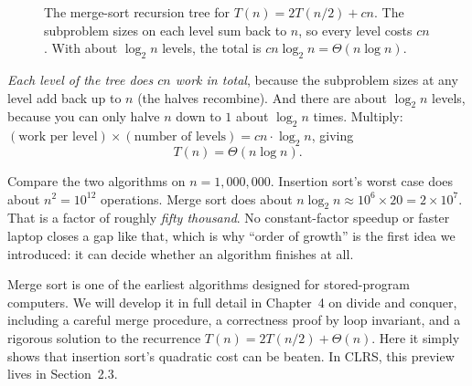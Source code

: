 \begin{figure}[H]
\centering
{}
\caption{The merge-sort recursion tree for $T(n)=2T(n/2)+cn$. The subproblem sizes on
each level sum back to $n$, so every level costs $cn$. With about $\log_2 n$ levels, the
total is $cn\log_2 n = \Theta(n\log n)$.}
\label{ch02:fig-tree}
\end{figure}

\emph{Each level of the tree does $cn$ work in total}, because the
subproblem sizes at any level add back up to $n$ (the halves recombine). And there are
about $\log_2 n$ levels, because you can only halve $n$ down to $1$ about $\log_2 n$
times. Multiply: $(\text{work per level}) \times (\text{number of levels}) = cn \cdot
\log_2 n$, giving
\[
T(n) = \Theta(n \log n).
\]

\begin{focusbox}
Compare the two algorithms on $n = 1{,}000{,}000$. Insertion sort's worst case does
about $n^2 = 10^{12}$ operations. Merge sort does about $n \log_2 n \approx 10^6 \times 20
= 2 \times 10^7$. That is a factor of roughly \emph{fifty thousand}. No constant-factor
speedup or faster laptop closes a gap like that, which is why ``order of growth'' is the
first idea we introduced: it can decide whether an algorithm finishes at all.
\end{focusbox}

\begin{connectionbox}
Merge sort is one of the earliest algorithms designed for stored-program computers.
We will develop it in full detail in Chapter~4 on divide and conquer, including
a careful merge procedure, a correctness proof by loop invariant, and a rigorous
solution to the recurrence $T(n) = 2T(n/2) + \Theta(n)$. Here it simply shows
that insertion sort's quadratic cost can be beaten.
In CLRS, this preview lives in Section~2.3.
\end{connectionbox}

